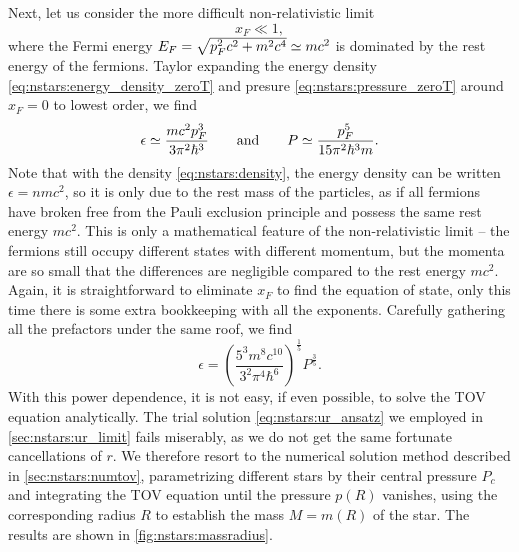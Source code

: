 Next, let us consider the more difficult non-relativistic limit
\begin{equation}
	x_F \ll 1,
\label{eq:nstars:nr_limit}
\end{equation}
where the Fermi energy $E_F = \sqrt{p_F^2 c^2 + m^2 c^4} \simeq m c^2$ is dominated by the rest energy of the fermions.
Taylor expanding the energy density \eqref{eq:nstars:energy_density_zeroT} and presure \eqref{eq:nstars:pressure_zeroT} around $x_F = 0$ to lowest order, we find
\begin{equation}
	\epsilon \simeq \frac{m c^2 p_F^3}{3 \pi^2 \hbar^3}
	\qquad \text{and} \qquad
	P        \simeq \frac{p_F^5}{15 \pi^2 \hbar^3 m} .
\end{equation}
Note that with the density \eqref{eq:nstars:density}, the energy density can be written $\epsilon = n m c^2$, so it is only due to the rest mass of the particles, as if all fermions have broken free from the Pauli exclusion principle and possess the same rest energy $m c^2$.
This is only a mathematical feature of the non-relativistic limit -- the fermions still occupy different states with different momentum, but the momenta are so small that the differences are negligible compared to the rest energy $mc^2$.
Again, it is straightforward to eliminate $x_F$ to find the equation of state, only this time there is some extra bookkeeping with all the exponents.
Carefully gathering all the prefactors under the same roof, we find
\begin{equation}
	\epsilon = \left( \frac{5^3 m^8 c^{10}}{3^2 \pi^4 \hbar^6} \right)^{\frac15}  P^{\frac35} .
\label{eq:nstars:nr_eos}
\end{equation}
With this power dependence, it is not easy, if even possible, to solve the TOV equation analytically.
The trial solution \eqref{eq:nstars:ur_ansatz} we employed in \cref{sec:nstars:ur_limit} fails miserably, as we do not get the same fortunate cancellations of $r$.
We therefore resort to the numerical solution method described in \cref{sec:nstars:numtov}, parametrizing different stars by their central pressure $P_c$ and integrating the TOV equation until the pressure $p(R)$ vanishes, using the corresponding radius $R$ to establish the mass $M = m(R)$ of the star.
The results are shown in \cref{fig:nstars:massradius}.

